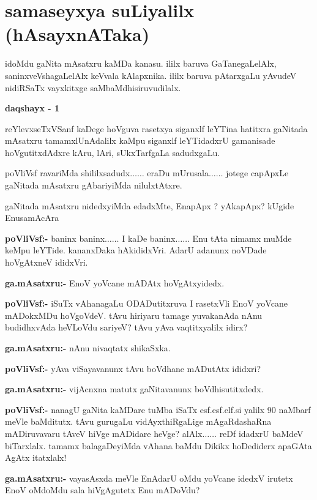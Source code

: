 \chapter{samaseyxya suLiyalilx (hAsayxnATaka)} 

idoMdu gaNita mAsatxru kaMDa kanasu. ililx baruva GaTanegaLelAlx, saninxveVshagaLelAlx keVvala kAlapxnika. ililx baruva pAtarxgaLu yAvudeV nidiRSaTx vayxkitxge saMbaMdhisiruvudilalx. 

\begin{center}
{\bf  daqshayx - {\rm 1}}
\end{center}

reYlevxseTxVSanf kaDege hoVguva rasetxya siganxlf leYTina hatitxra gaNitada mAsatxru tamamxlUnAdalilx kaMpu siganxlf leYTidadxrU gamanisade hoVgutitxdAdxre kAru, lAri, sUkxTarfgaLa sadudxgaLu.

poVliVsf ravariMda shililxsadudx$\ldots\ldots$ eraDu mUrusala$\ldots\ldots$ jotege capApxLe gaNitada mAsatxru gAbariyiMda nilulxtAtxre.

gaNitada mAsatxru nidedxyiMda edadxMte, EnapApx ? yAkapApx? kUgide EnusamAcAra

\noindent
\textbf{poVliVsf:-} baninx baninx$\ldots\ldots$ I kaDe baninx$\ldots\ldots$ Enu tAta nimamx muMde keMpu leYTide. kananxDaka hAkididxVri. AdarU adanunx noVDade hoVgAtxneV ididxVri.

\smallskip
\noindent
\textbf{ga.mAsatxru:-} EnoV yoVcane mADAtx hoVgAtxyidedx.

\smallskip
\noindent
\textbf{poVliVsf:-} iSuTx vAhanagaLu ODADutitxruva I rasetxVli EnoV yoVcane mADokxMDu hoVgoVdeV. tAvu hiriyaru tamage yuvakanAda nAnu budidhxvAda heVLoVdu sariyeV? tAvu yAva vaqtitxyalilx idirx?

\smallskip
\noindent
\textbf{ga.mAsatxru:-} nAnu nivaqtatx shikaSxka.

\smallskip
\noindent
\textbf{poVliVsf:-} yAva viSayavanunx tAvu boVdhane mADutAtx ididxri?

\smallskip
\noindent
\textbf{ga.mAsatxru:-} vijAcnxna matutx gaNitavanunx boVdhisutitxdedx.

\smallskip
\noindent
\textbf{poVliVsf:-} nanagU gaNita kaMDare tuMba iSaTx esf.esf.elf.si yalilx {\rm 90} naMbarf meVle baMditutx. tAvu gurugaLu vidAyxthiRgaLige mAgaRdashaRna mADiruvavaru tAveV hiVge mADidare heVge? alAlx$\ldots\ldots$ reDf idadxrU baMdeV biTarxlalx. tamamx balagaDeyiMda vAhana baMdu Dikikx hoDediderx apaGAta AgAtx itatxlalx!

\smallskip
\noindent
\textbf{ga.mAsatxru:-} vayasAsxda meVle EnAdarU oMdu yoVcane idedxV irutetx EnoV oMdoMdu sala hiVgAgutetx Enu mADoVdu?


